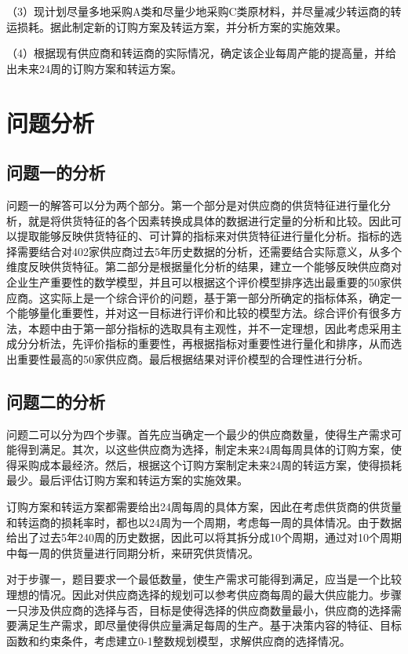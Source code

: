 \documentclass[withoutpreface,bwprint]{cumcmthesis} %
\begin{document}
（3）现计划尽量多地采购A类和尽量少地采购C类原材料，并尽量减少转运商的转运损耗。据此制定新的订购方案及转运方案，并分析方案的实施效果。

（4）根据现有供应商和转运商的实际情况，确定该企业每周产能的提高量，并给出未来24周的订购方案和转运方案。

\section{问题分析}

\subsection{问题一的分析}

问题一的解答可以分为两个部分。第一个部分是对供应商的供货特征进行量化分析，就是将供货特征的各个因素转换成具体的数据进行定量的分析和比较。因此可以提取能够反映供货特征的、可计算的指标来对供货特征进行量化分析。指标的选择需要结合对402家供应商过去5年历史数据的分析，还需要结合实际意义，从多个维度反映供货特征。第二部分是根据量化分析的结果，建立一个能够反映供应商对企业生产重要性的数学模型，并且可以根据这个评价模型排序选出最重要的50家供应商。这实际上是一个综合评价的问题，基于第一部分所确定的指标体系，确定一个能够量化重要性，并对这一目标进行评价和比较的模型方法。综合评价有很多方法，本题中由于第一部分指标的选取具有主观性，并不一定理想，因此考虑采用主成分分析法，先评价指标的重要性，再根据指标对重要性进行量化和排序，从而选出重要性最高的50家供应商。最后根据结果对评价模型的合理性进行分析。

\subsection{问题二的分析}

问题二可以分为四个步骤。首先应当确定一个最少的供应商数量，使得生产需求可能得到满足。其次，以这些供应商为选择，制定未来24周每周具体的订购方案，使得采购成本最经济。然后，根据这个订购方案制定未来24周的转运方案，使得损耗最少。最后评估订购方案和转运方案的实施效果。

订购方案和转运方案都需要给出24周每周的具体方案，因此在考虑供货商的供货量和转运商的损耗率时，都也以24周为一个周期，考虑每一周的具体情况。由于数据给出了过去5年240周的历史数据，因此可以将其拆分成10个周期，通过对10个周期中每一周的供货量进行同期分析，来研究供货情况。

对于步骤一，题目要求一个最低数量，使生产需求可能得到满足，应当是一个比较理想的情况。因此对供应商选择的规划可以参考供应商每周的最大供应能力。步骤一只涉及供应商的选择与否，目标是使得选择的供应商数量最小，供应商的选择需要满足生产需求，即尽量使得供应量满足每周的生产。基于决策内容的特征、目标函数和约束条件，考虑建立0-1整数规划模型，求解供应商的选择情况。
\end{document}
